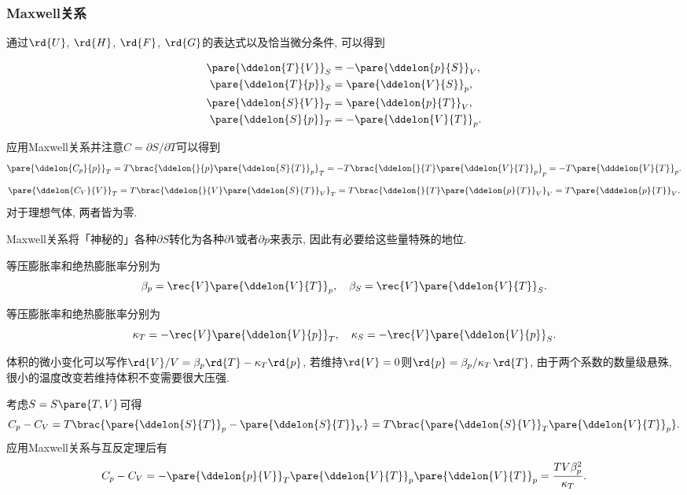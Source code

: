 \documentclass[../Thermal.tex]{subfiles}
\begin{document}
\subsubsection{Maxwell关系}
通过$\rd{U}$, $\rd{H}$, $\rd{F}$, $\rd{G}$的表达式以及恰当微分条件, 可以得到
\begin{finale}
\begin{corollary}[Maxwell关系]
\begin{align*}
\pare{\ddelon{T}{V}}_S &= -\pare{\ddelon{p}{S}}_V, \\
\pare{\ddelon{T}{p}}_S &= \pare{\ddelon{V}{S}}_p, \\
\pare{\ddelon{S}{V}}_T &= \pare{\ddelon{p}{T}}_V, \\
\pare{\ddelon{S}{p}}_T &= -\pare{\ddelon{V}{T}}_p.
\end{align*}
\end{corollary}
\end{finale}
\begin{ex}
应用Maxwell关系并注意$C=\partial S/\partial T$可以得到
\[ \pare{\ddelon{C_p}{p}}_T = T \brac{\ddelon{}{p}\pare{\ddelon{S}{T}}_p}_T = -T\brac{\ddelon{}{T}\pare{\ddelon{V}{T}}_p}_p = -T\pare{\dddelon{V}{T}}_p. \]
\[ \pare{\ddelon{C_V}{V}}_T = T \brac{\ddelon{}{V}\pare{\ddelon{S}{T}}_V}_T = T\brac{\ddelon{}{T}\pare{\ddelon{p}{T}}_V}_V =T\pare{\dddelon{p}{T}}_V. \]
对于理想气体, 两者皆为零.
\end{ex}
Maxwell关系将「神秘的」各种$\partial S$转化为各种$\partial V$或者$\partial p$来表示, 因此有必要给这些量特殊的地位.
\begin{definition}[等压膨胀率和绝热膨胀率]
等压膨胀率和绝热膨胀率分别为
\[ \beta_p = \rec{V}\pare{\ddelon{V}{T}}_p,\quad \beta_S = \rec{V}\pare{\ddelon{V}{T}}_S. \]
\end{definition}
\begin{definition}[等温压缩率和绝热压缩率]
等压膨胀率和绝热膨胀率分别为
\[ \kappa_T = -\rec{V}\pare{\ddelon{V}{p}}_T,\quad \kappa_S = -\rec{V}\pare{\ddelon{V}{p}}_S. \]
\end{definition}
\begin{remark}
\label{rm:体积的改变用膨胀率和压缩率写出}
体积的微小变化可以写作$\rd{V}/V = \beta_p \rd{T} - \kappa_T \rd{p}$, 若维持$\rd{V} = 0$则$\rd{p} = \beta_p/\kappa_T\,\rd{T}$, 由于两个系数的数量级悬殊, 很小的温度改变若维持体积不变需要很大压强.
\end{remark}
\begin{ex}
考虑$S=S\pare{T,V}$可得
\[ C_p - C_V = T\brac{\pare{\ddelon{S}{T}}_p - \pare{\ddelon{S}{T}}_V} = T\brac{\pare{\ddelon{S}{V}}_T\pare{\ddelon{V}{T}}_p}. \]
应用Maxwell关系与互反定理后有
\[ C_p - C_V = -\pare{\ddelon{p}{V}}_T\pare{\ddelon{V}{T}}_p\pare{\ddelon{V}{T}}_p = \frac{TV\beta_p^2}{\kappa_T}. \]
\end{ex}
\end{document}
